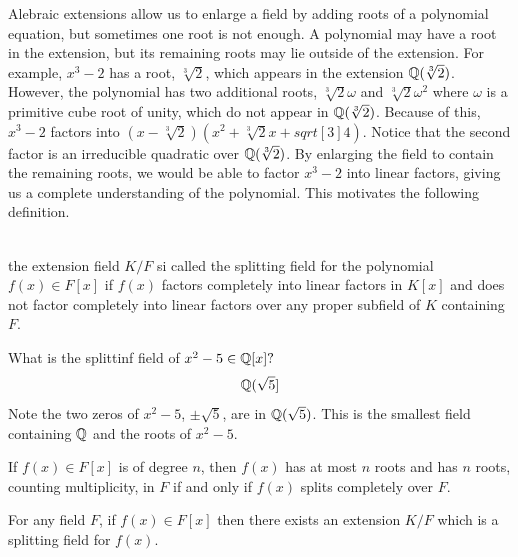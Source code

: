 Alebraic extensions allow us to enlarge a field by adding roots of a polynomial equation, but sometimes one root is not enough. A polynomial may have a root in the extension, but its remaining roots may lie outside of the extension. For example, $x^3-2$ has a root, $\sqrt[3]{2}$, which appears in the extension $\mathbb{Q}(\sqrt[3]{2})$. However, the polynomial has two additional roots, $\sqrt[3]{2}\omega$ and $\sqrt[3]{2}\omega^2$ where $\omega$ is a primitive cube root of unity, which do not appear in $\mathbb{Q}(\sqrt[3]{2})$. Because of this, $x^3-2$ factors into $(x-\sqrt[3]{2})(x^2+\sqrt[3]{2}x+sqrt[3]{4})$. Notice that the second factor is an irreducible quadratic over $\mathbb{Q}(\sqrt[3]{2})$. By enlarging the field to contain the remaining roots, we would be able to factor $x^3-2$ into linear factors, giving us a complete understanding of the polynomial. This motivates the following definition.

\begin{definition} \leavevmode \\
    the extension field $K/F$ si called the splitting field for the polynomial $f(x) \in F[x]$ if $f(x)$ factors completely into linear factors in $K[x]$ and does not factor completely into linear factors over any proper subfield of $K$ containing $F$.
\end{definition}

\begin{example}
    What is the splittinf field of $x^2-5 \in \mathbb{Q}[x]?$
    $$\mathbb{Q}(\sqrt{5}]$$
    Note the two zeros of $x^2-5$, $\pm \sqrt{5}$, are in $\mathbb{Q}(\sqrt{5})$. This is the smallest field containing $\mathbb{Q}$ and the roots of $x^2-5$.
\end{example}

\begin{remark}
    If $f(x) \in F[x]$ is of degree $n$, then $f(x)$ has at most $n$ roots and has $n$ roots, counting multiplicity, in $F$ if and only if $f(x)$ splits completely over $F$.
\end{remark}

\begin{theorem}
    For any field $F$, if $f(x) \in F[x]$ then there exists an extension $K/F$ which is a splitting field for $f(x)$.
\end{theorem}

